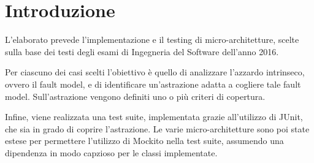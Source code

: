 \chapter{Introduzione}

L'elaborato prevede l'implementazione e il testing di micro-architetture, scelte sulla base dei testi degli esami di Ingegneria del Software dell'anno 2016.

Per ciascuno dei casi scelti l'obiettivo è quello di analizzare l'azzardo intrinseco, ovvero il fault model, e di identificare un'astrazione adatta a cogliere tale fault model. Sull'astrazione vengono definiti uno o più criteri di copertura.

Infine, viene realizzata una test suite, implementata grazie all'utilizzo di JUnit, che sia in grado di coprire l'astrazione. 
Le varie micro-architetture sono poi state estese per permettere l'utilizzo di Mockito nella test suite, assumendo una dipendenza in modo capzioso per le classi implementate.